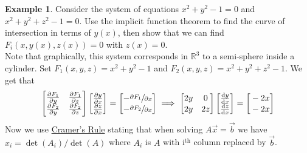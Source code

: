 \documentclass[
	12pt,
	]{article}
\newcommand{\R}{\mathbb{R}}
\theoremstyle{custom}
\theoremstyle{custom}
\theoremstyle{custom}
\theoremstyle{custom}
\theoremstyle{custom}
\theoremstyle{definition}
\newtheorem{example}{Example}[section]
\theoremstyle{example}
\theoremstyle{note}
\theoremstyle{remark}
\theoremstyle{example}
\newcounter{theo}[section]\setcounter{theo}{0}
\numberwithin{equation}{subsection}
\begin{document}
	   		 \begin{example}
	   		 	Consider the system of equations $x^{2} + y^{2} -1 = 0$ and $x^{2} + y^{2} + z^{2} -1 =0$. Use the implicit function theorem to find the curve of intersection in terms of $y(x)$, then show that we can find $F_{i}(x,y(x), z(x)) = 0 $ with $z(x) =0 $.\\
	   		 	
	   		 	\noindent Note that graphically, this system corresponds in $\R^{3}$ to a semi-sphere inside a cylinder.
	   		 	Set $F_{1}(x,y,z) = x^{2} + y^{2} -1 $ and $F_{2}(x,y,z) = x^{2} + y^{2} +z^{2} -1$. We get that 
	   		 	\begin{equation*}
	   		 		\begin{bmatrix}
	   		 		\strut \pdv{F_{1}}{y} & \strut \pdv{F_{1}}{z} \\
	   		 			\strut \pdv{F_{2}}{y} &\strut\pdv{F_{2}}{z}
	   		 		\end{bmatrix}
	   		 		\begin{bmatrix}
		   		 		\pdv{y}{x} \\
		   		 		\pdv{z}{x}
	   		 		\end{bmatrix}
	   		 		=
	   		 		\begin{bmatrix}
	   		 			- \vphantom{\pdv{y}{x}}\sfrac{\partial F_{1}}{\partial x}\\
	   		 			- \vphantom{\pdv{y}{x}}\sfrac{\partial F_{2}}{ \partial x}
	   		 		\end{bmatrix} \implies 
	   		 		\begin{bmatrix}
	   		 			\vphantom{\pdv{y}{x}}2y & \vphantom{\pdv{y}{x}}0 \\
	   		 			\vphantom{\pdv{y}{x}}2y &\vphantom{\pdv{y}{x}} 2z
	   		 		\end{bmatrix}
	   		 		\begin{bmatrix}
	   		 			 \dv{y}{x} \\
	   		 			 \dv{z}{x}
	   		 		\end{bmatrix}
	   		 		=
	   		 		\begin{bmatrix}
	   		 			\vphantom{\pdv{y}{x}}-2x \\
	   		 			\vphantom{\pdv{y}{x}}-2x
	   		 		\end{bmatrix}
	   		 	\end{equation*}
	   		 	Now we use \underline{Cramer's Rule} stating that when solving $A\vec{x} = \vec{b}$ we have $x_{i} = \det(A_{i}) / \det(A)$ where $A_{i}$ is $A$ with i$^{\text{th}}$ column replaced by $\vec{b}$.
	   		 	\begin{equation*}

\end{equation*}
\end{example}
\end{document}
